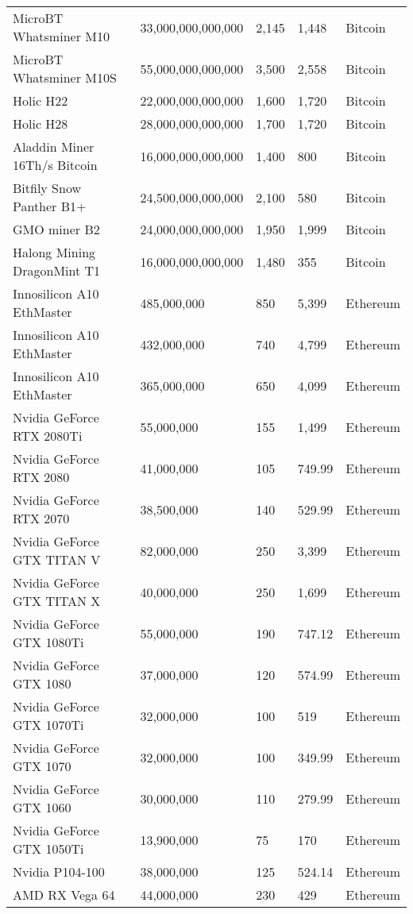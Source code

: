 \begin{longtable}{|p{}|p{}|p{}|p{}|p{}|}
  MicroBT Whatsminer M10 & 33,000,000,000,000 & 2,145 & 1,448 & Bitcoin \\
  MicroBT Whatsminer M10S & 55,000,000,000,000 & 3,500 & 2,558 & Bitcoin \\
  Holic H22 & 22,000,000,000,000 & 1,600 & 1,720 & Bitcoin \\
  Holic H28 & 28,000,000,000,000 & 1,700 & 1,720 & Bitcoin \\
  Aladdin Miner 16Th/s Bitcoin & 16,000,000,000,000 & 1,400 & 800 & Bitcoin \\
  Bitfily Snow Panther B1+ & 24,500,000,000,000 & 2,100 & 580 & Bitcoin \\
  GMO miner B2 & 24,000,000,000,000 & 1,950 & 1,999 & Bitcoin \\
  Halong Mining DragonMint T1 & 16,000,000,000,000 & 1,480 & 355 & Bitcoin \\
  \hline
  Innosilicon A10 EthMaster & 485,000,000 & 850 & 5,399 & Ethereum \\
  Innosilicon A10 EthMaster & 432,000,000 & 740 & 4,799 & Ethereum \\
  Innosilicon A10 EthMaster & 365,000,000 & 650 & 4,099 & Ethereum \\
  Nvidia GeForce RTX 2080Ti & 55,000,000 & 155 & 1,499 & Ethereum \\
  Nvidia GeForce RTX 2080 & 41,000,000 & 105 & 749.99 & Ethereum \\
  Nvidia GeForce RTX 2070 & 38,500,000 & 140 & 529.99 & Ethereum \\
  Nvidia GeForce GTX TITAN V & 82,000,000 & 250 & 3,399 & Ethereum \\
  Nvidia GeForce GTX TITAN X & 40,000,000 & 250 & 1,699 & Ethereum \\
  Nvidia GeForce GTX 1080Ti & 55,000,000 & 190 & 747.12 & Ethereum \\
  Nvidia GeForce GTX 1080 & 37,000,000 & 120 & 574.99 & Ethereum \\
  Nvidia GeForce GTX 1070Ti & 32,000,000 & 100 & 519 & Ethereum \\
  Nvidia GeForce GTX 1070 & 32,000,000 & 100 & 349.99 & Ethereum \\
  Nvidia GeForce GTX 1060 & 30,000,000 & 110 & 279.99 & Ethereum \\
  Nvidia GeForce GTX 1050Ti & 13,900,000 & 75 & 170 & Ethereum \\
  Nvidia P104-100 & 38,000,000 & 125 & 524.14 & Ethereum \\
  AMD RX Vega 64 & 44,000,000 & 230 & 429 & Ethereum \\

\end{longtable}
